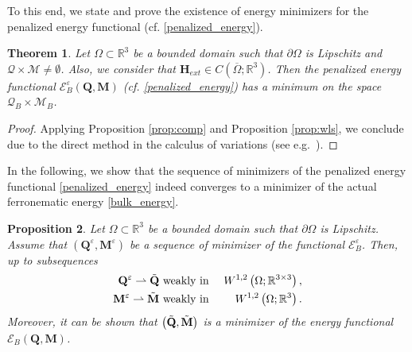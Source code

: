 \documentclass{article}
\newtheorem{theorem}{Theorem}[section]
\newtheorem{proposition}[theorem]{Proposition}
\def\Qvec{\mathbf{Q}}
\def \Mvec{\mathbf{M}}
\def\Hvec{\mathbf{H}}
\begin{document}
To this end, we state and prove the existence of energy minimizers for the penalized energy functional (cf. \eqref{penalized_energy}).
\begin{theorem}\label{existence_in_limit}
Let $\Omega\subset\mathbb R^3$ be a bounded domain such that $\partial\Omega$ is Lipschitz and $\mathcal{Q}\times\mathcal{M}\ne\emptyset$. Also, we consider that $\Hvec_{ext}\in C\left(\overline{\Omega}; \mathbb R^3\right)$. Then the penalized energy functional $\mathcal{E}^{\varepsilon}_B\left(\Qvec, \Mvec\right)$ (cf. \eqref{penalized_energy}) has a minimum on the space $\mathcal{Q}_B\times\mathcal{M}_B$.  
\end{theorem}
\begin{proof}
Applying Proposition \ref{prop:comp} and Proposition \ref{prop:wls}, we conclude  due to the direct method in the calculus of variations (see e.g.\ \cite{Rindler}). 
\end{proof}
In the following, we show that the sequence of minimizers of the penalized energy functional \eqref{penalized_energy} indeed converges to a minimizer of the actual ferronematic energy \eqref{bulk_energy}.
\begin{proposition}\label{energy_bound}
Let $\Omega\subset\mathbb R^3$ be a bounded domain such that $\partial\Omega$ is Lipschitz. Assume that $\left(\Qvec^{\varepsilon}, \Mvec^{\varepsilon}\right)$ be a sequence of minimizer of the functional $\mathcal{E}^{\varepsilon}_B$. Then, up to subsequences 
\begin{eqnarray}
\Qvec^{\varepsilon}\rightharpoonup\Tilde{\Qvec} &\mbox{ weakly in }& W^{1,2}\left(\Omega; \mathbb R^{3\times 3}\right),\\
\Mvec^{\varepsilon}\rightharpoonup\Tilde{\Mvec} &\mbox{ weakly in }& W^{1,2}\left(\Omega; \mathbb R^3\right).
\end{eqnarray}
Moreover, it can be shown that $\left(\Tilde{\Qvec}, \Tilde{\Mvec}\right)$ is a minimizer of the energy functional $\mathcal{E}_B\left(\Qvec, \Mvec\right)$.
\end{proposition}
\end{document}
